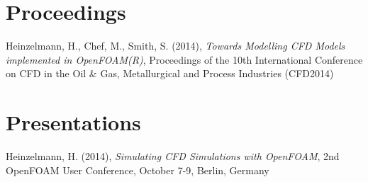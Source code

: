 \section*{Proceedings}

\noindent
Heinzelmann, H., Chef, M., Smith, S. (2014), \emph{Towards Modelling CFD Models 
implemented in OpenFOAM(R)}, Proceedings of the 10th International Conference on CFD 
in the Oil \& Gas, Metallurgical and Process Industries (CFD2014)
\vspace{1ex}



\section*{Presentations}

\noindent
Heinzelmann, H. (2014), \emph{Simulating CFD Simulations with OpenFOAM}, 
2nd OpenFOAM User Conference, October 7-9, Berlin, Germany
\vspace{1ex}


